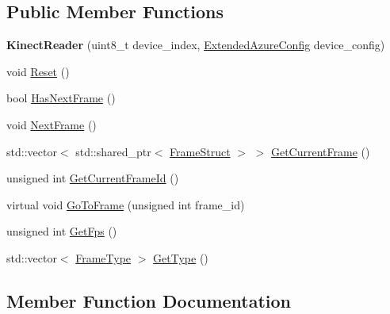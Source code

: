 \subsection*{Public Member Functions}
\begin{DoxyCompactItemize}
\item 
\mbox{\label{classmoetsi_1_1ssp_1_1KinectReader_af992a9575612d1919ce9cf70b450e2e9}} 
{\bfseries Kinect\+Reader} (uint8\+\_\+t device\+\_\+index, \hyperlink{structmoetsi_1_1ssp_1_1ExtendedAzureConfig}{Extended\+Azure\+Config} device\+\_\+config)
\item 
void \hyperlink{classmoetsi_1_1ssp_1_1KinectReader_a0ad8f7b57ef04554e41a66db797c000e}{Reset} ()
\item 
bool \hyperlink{classmoetsi_1_1ssp_1_1KinectReader_a08934b6eff437142e482bb21780ca171}{Has\+Next\+Frame} ()
\item 
void \hyperlink{classmoetsi_1_1ssp_1_1KinectReader_a8495eb28b3893281c1d4bbd5ba9f9739}{Next\+Frame} ()
\item 
std\+::vector$<$ std\+::shared\+\_\+ptr$<$ \hyperlink{structmoetsi_1_1ssp_1_1FrameStruct}{Frame\+Struct} $>$ $>$ \hyperlink{classmoetsi_1_1ssp_1_1KinectReader_a7f0d8f5d643ebeff0589eeb8af5b9a9e}{Get\+Current\+Frame} ()
\item 
unsigned int \hyperlink{classmoetsi_1_1ssp_1_1KinectReader_aa17e268723c41bdad5082575decb28eb}{Get\+Current\+Frame\+Id} ()
\item 
virtual void \hyperlink{classmoetsi_1_1ssp_1_1KinectReader_a315690c46e153a35d4ded1189e93af08}{Go\+To\+Frame} (unsigned int frame\+\_\+id)
\item 
unsigned int \hyperlink{classmoetsi_1_1ssp_1_1KinectReader_ac88c13693ce8e2e249438ac8de8a7b3c}{Get\+Fps} ()
\item 
std\+::vector$<$ \hyperlink{namespacemoetsi_1_1ssp_a46efdfa2cd5a28ead465dcc8006b5a87}{Frame\+Type} $>$ \hyperlink{classmoetsi_1_1ssp_1_1KinectReader_aef896aa686cbe1ea82dfc6aad46b6ff7}{Get\+Type} ()
\end{DoxyCompactItemize}


\subsection{Member Function Documentation}
\mbox{\label{classmoetsi_1_1ssp_1_1KinectReader_a7f0d8f5d643ebeff0589eeb8af5b9a9e}} 
